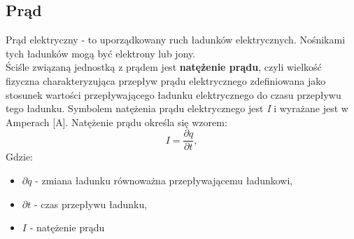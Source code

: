 \documentclass[12pt]{article}
\begin{document}
\subsection{Prąd}
Prąd elektryczny - to uporządkowany ruch ładunków elektrycznych. Nośnikami tych ładunków mogą być elektrony lub jony.\\
Ściśle związaną jednostką z prądem jest \textbf{natężenie prądu}, czyli wielkość fizyczna charakteryzująca przepływ prądu elektrycznego zdefiniowana jako stosunek wartości przepływającego ładunku elektrycznego do czasu przepływu tego ładunku.
Symbolem natężenia prądu elektrycznego jest \textit{I} i wyrażane jest w Amperach [A]. Natężenie prądu określa się wzorem:
\begin{equation}
    I = \frac{\partial{q}}{\partial{t}},
\end{equation}
Gdzie:
    \begin{itemize}[noitemsep]
        \item $\partial{q}$ - zmiana ładunku równoważna przepływającemu ładunkowi,
        \item $\partial{t}$ - czas przepływu ładunku,
        \item $I$ - natężenie prądu
    \end{itemize}
\end{document}
